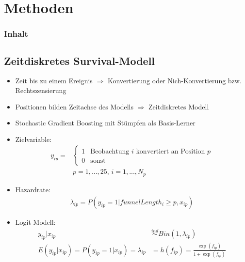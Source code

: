 \section{Methoden}

\begin{frame}\frametitle{Inhalt}
\end{frame}

\subsection{Zeitdiskretes Survival-Modell}

\begin{frame}
	\begin{itemize}
		\item Zeit bis zu einem Ereignis $\Rightarrow$ Konvertierung oder Nich-Konvertierung bzw. Rechtszensierung
		\item Positionen bilden Zeitachse des Modells $\Rightarrow$ Zeitdiskretes Modell
		\item Stochastic Gradient Boosting mit Stümpfen als Basis-Lerner
	\end{itemize}
\end{frame}

\begin{frame}
	\begin{itemize}
		\item Zielvariable:	
			\begin{align*}
				y_{ip} =& \begin{cases} 1 & \text{Beobachtung } i \text{ konvertiert an Position } p\\
															 0 & \text{sonst} 
								 \end{cases}\\
								&p=1,...,25 \text{, } i=1,...,N_p 
			\end{align*}	
		\item Hazardrate: 
			\begin{align*}
				\lambda_{ip} = P(y_{ip}=1|funnelLength_i \geq p, x_{ip})
			\end{align*}
		\item Logit-Modell: 
			\begin{align*}
				y_{ip}|x_{ip} &\stackrel{ind}{\sim} Bin(1, \lambda_{ip})  \\
				E(y_{ip}|x_{ip}) = P(y_{ip} = 1|x_{ip}) = \lambda_{ip} &= h(f_{ip}) = \frac{\exp(f_{ip})}{1+\exp(f_{ip})}
			\end{align*}
	\end{itemize}
\end{frame}

